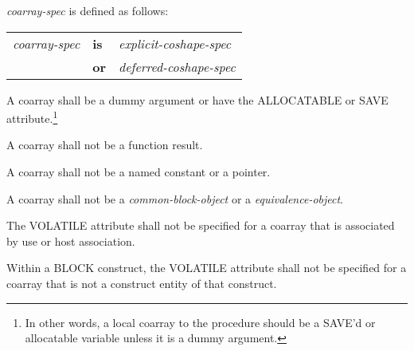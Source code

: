 %
{\it coarray-spec} is defined as follows:
%
\begin{center}
 \begin{tabular}{lll}
  {\it coarray-spec} & {\bf is} & {\it explicit-coshape-spec}\\
                     & {\bf or} & {\it deferred-coshape-spec}\\
 \end{tabular}
\end{center}
%

\begin{Constraints F}
\item A coarray shall be a dummy argument or have the ALLOCATABLE or SAVE 
attribute.\footnote
{In other words, a local coarray to the procedure should be a SAVE'd or allocatable
variable unless it is a dummy argument.}

\item A coarray shall not be a function result.

\item A coarray shall not be a named constant or a pointer. 

\item A coarray shall not be a {\it common-block-object}
or a {\it equivalence-object}.

\item The VOLATILE attribute shall not be specified for a coarray that is 
associated by use or host association. %

\item Within a BLOCK construct, the VOLATILE attribute shall not be specified
for a coarray that is not a construct entity of that construct.  %

\end{Constraints F}

